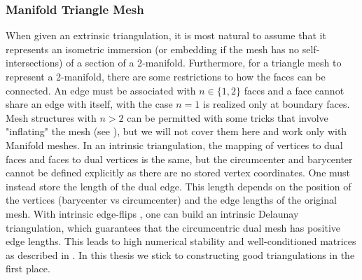 \subsubsection*{Manifold Triangle Mesh}
When given an extrinsic triangulation, it is most natural to assume that it represents an isometric immersion (or embedding if the mesh has no self-intersections) of a section of a 2-manifold. Furthermore, for a triangle mesh to represent a 2-manifold, there are some restrictions to how the faces can be connected. An edge must be associated with $n \in \{1, 2\}$ faces and a face cannot share an edge with itself, with the case $n=1$ is realized only at boundary faces. Mesh structures with $n>2$ can be permitted with some tricks that involve "inflating" the mesh (see \cite{nonmanifold_laplacian}), but we will not cover them here and work only with Manifold meshes. 
In an intrinsic triangulation, the mapping of vertices to dual faces and faces to dual vertices is the same, but the circumcenter and barycenter cannot be defined explicitly as there are no stored vertex coordinates. One must instead store the length of the dual edge. This length depends on the position of the vertices (barycenter vs circumcenter) and the edge lengths of the original mesh. With intrinsic edge-flips \cite{sharp2021intrinsic}, one can build an intrinsic Delaunay triangulation, which guarantees that the circumcentric dual mesh has positive edge lengths. This leads to high numerical stability and well-conditioned matrices as described in \cite{intrinsic_laplacian}. In this thesis we stick to constructing good triangulations in the first place.
